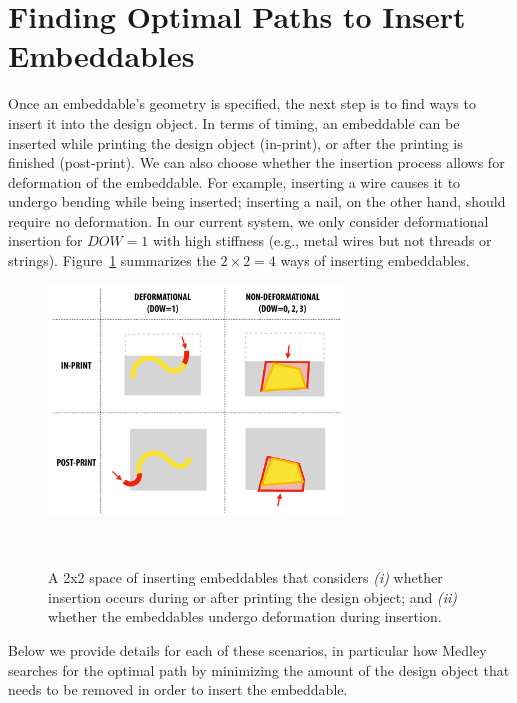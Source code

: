 \section{Finding Optimal Paths to Insert Embeddables}
Once an embeddable's geometry is specified, the next step is to find ways to insert it into the design object. In terms of timing, an embeddable can be inserted while printing the design object (in-print), or after the printing is finished (post-print). We can also choose whether the insertion process allows for deformation of the embeddable. For example, inserting a wire causes it to undergo bending while being inserted; inserting a nail, on the other hand, should require no deformation. In our current system, we only consider deformational insertion for $DOW=1$ with high stiffness (e.g., metal wires but not threads or strings). %
Figure~\ref{fig:insertion} summarizes the $2\times2=4$ ways of inserting embeddables.

\begin{figure} [h]
  \centering
  \includegraphics[width=0.7\textwidth]{figures/insertion}
  \caption{A 2x2 space of inserting embeddables that considers {\em(i)} whether insertion occurs during or after printing the design object; and {\em(ii)} whether the embeddables undergo deformation during insertion.}~\label{fig:insertion}
\end{figure}

Below we provide details for each of these scenarios, in particular how Medley searches for the optimal path by minimizing the amount of the design object that needs to be removed in order to insert the embeddable.

